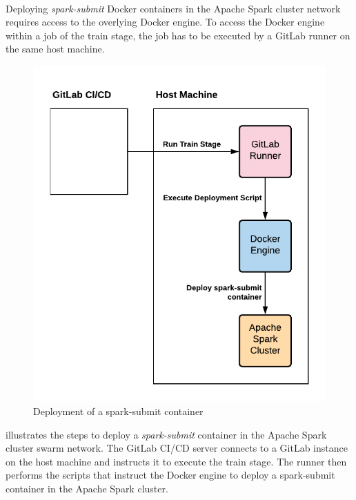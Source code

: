 \paragraph{}
Deploying \textit{spark-submit} Docker containers in the Apache Spark cluster network requires access to the overlying Docker engine.
To access the Docker engine within a job of the train stage, the job has to be executed by a GitLab runner on the same host machine.
\begin{figure}[h]
\centering
\includegraphics[scale=1]{images/05_conceptual_design/automated_deployment_pipeline/train_stage_runner}
\caption{Deployment of a spark-submit container}
\label{fig:05_deployment_train_concept}
\end{figure}
 illustrates the steps to deploy a \textit{spark-submit} container in the Apache Spark cluster swarm network.
The GitLab CI/CD server connects to a GitLab instance on the host machine and instructs it to execute the train stage.
The runner then performs the scripts that instruct the Docker engine to deploy a spark-submit container in the Apache Spark cluster.

